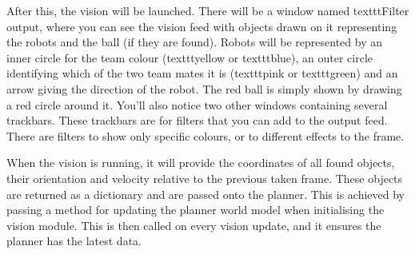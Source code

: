 After this, the vision will be launched. There will be a window named texttt{Filter output}, where you can see the vision feed with objects drawn on it representing the robots and the ball (if they are found). Robots will be represented by an inner circle for the team colour (texttt{yellow} or texttt{blue}), an outer circle identifying which of the two team mates it is (texttt{pink} or texttt{green}) and an arrow giving the direction of the robot.  The red ball is simply shown by drawing a red circle around it. You'll also notice two other windows containing several trackbars. These trackbars are for filters that you can add to the output feed. There are filters to show only specific colours, or to different effects to the frame.

When the vision is running, it will provide the coordinates of all found objects, their orientation and velocity relative to the previous taken frame. These objects are returned as a dictionary and are passed onto the planner. This is achieved by passing a method for updating the planner world model when initialising the vision module. This is then called on every vision update, and it ensures the planner has the latest data.